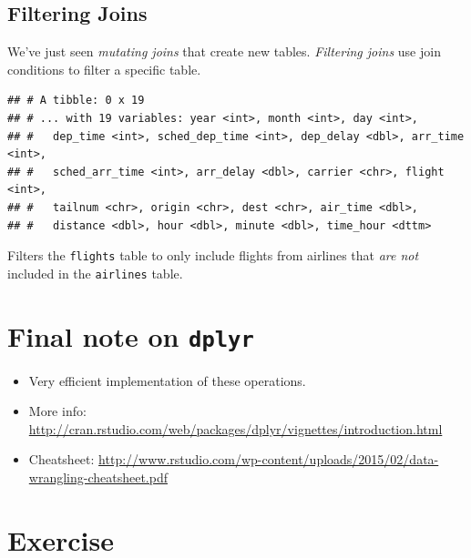 \documentclass[12pt,]{book}
\newenvironment{Shaded}{\begin{snugshade}}{\end{snugshade}}
\newcommand{\KeywordTok}[1]{\textcolor[rgb]{0.13,0.29,0.53}{\textbf{#1}}}
\newcommand{\DataTypeTok}[1]{\textcolor[rgb]{0.13,0.29,0.53}{#1}}
\newcommand{\StringTok}[1]{\textcolor[rgb]{0.31,0.60,0.02}{#1}}
\newcommand{\OperatorTok}[1]{\textcolor[rgb]{0.81,0.36,0.00}{\textbf{#1}}}
\newcommand{\NormalTok}[1]{#1}
\providecommand{\tightlist}{%
  \setlength{\itemsep}{0pt}\setlength{\parskip}{0pt}}
\theoremstyle{definition}
\theoremstyle{definition}
\theoremstyle{remark}
\begin{document}
\subsection{Filtering Joins}\label{filtering-joins}

We've just seen \emph{mutating joins} that create new tables.
\emph{Filtering joins} use join conditions to filter a specific table.

\begin{Shaded}
\end{Shaded}

\begin{verbatim}
## # A tibble: 0 x 19
## # ... with 19 variables: year <int>, month <int>, day <int>,
## #   dep_time <int>, sched_dep_time <int>, dep_delay <dbl>, arr_time <int>,
## #   sched_arr_time <int>, arr_delay <dbl>, carrier <chr>, flight <int>,
## #   tailnum <chr>, origin <chr>, dest <chr>, air_time <dbl>,
## #   distance <dbl>, hour <dbl>, minute <dbl>, time_hour <dttm>
\end{verbatim}

Filters the \texttt{flights} table to only include flights from airlines
that \emph{are not} included in the \texttt{airlines} table.

\section{\texorpdfstring{Final note on
\texttt{dplyr}}{Final note on dplyr}}\label{final-note-on-dplyr}

\begin{itemize}
\tightlist
\item
  Very efficient implementation of these operations.
\item
  More info:
  \url{http://cran.rstudio.com/web/packages/dplyr/vignettes/introduction.html}
\item
  Cheatsheet:
  \url{http://www.rstudio.com/wp-content/uploads/2015/02/data-wrangling-cheatsheet.pdf}
\end{itemize}

\section{Exercise}\label{exercise}
\end{document}
